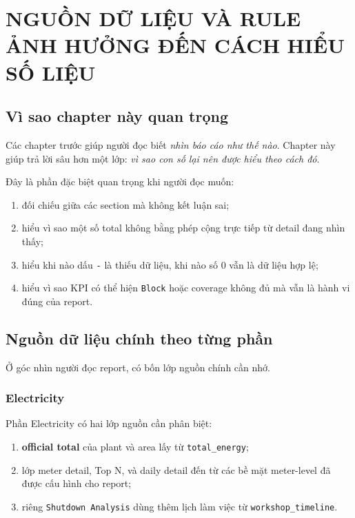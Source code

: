 \chapter{NGUỒN DỮ LIỆU VÀ RULE ẢNH HƯỞNG ĐẾN CÁCH HIỂU SỐ LIỆU}

\section{Vì sao chapter này quan trọng}

Các chapter trước giúp người đọc biết \textit{nhìn báo cáo như thế nào}. Chapter này giúp trả lời sâu hơn một lớp: \textit{vì sao con số lại nên được hiểu theo cách đó}.

Đây là phần đặc biệt quan trọng khi người đọc muốn:

\begin{enumerate}[label=-]
\item đối chiếu giữa các section mà không kết luận sai;
\item hiểu vì sao một số total không bằng phép cộng trực tiếp từ detail đang nhìn thấy;
\item hiểu khi nào dấu \texttt{-} là thiếu dữ liệu, khi nào số 0 vẫn là dữ liệu hợp lệ;
\item hiểu vì sao KPI có thể hiện \texttt{Block} hoặc coverage không đủ mà vẫn là hành vi đúng của report.
\end{enumerate}

\section{Nguồn dữ liệu chính theo từng phần}

Ở góc nhìn người đọc report, có bốn lớp nguồn chính cần nhớ.

\subsection{Electricity}

Phần Electricity có hai lớp nguồn cần phân biệt:

\begin{enumerate}[label=-]
\item \textbf{official total} của plant và area lấy từ \texttt{total\_energy};
\item lớp meter detail, Top N, và daily detail đến từ các bề mặt meter-level đã được cấu hình cho report;
\item riêng \texttt{Shutdown Analysis} dùng thêm lịch làm việc từ \texttt{workshop\_timeline}.
\end{enumerate}


